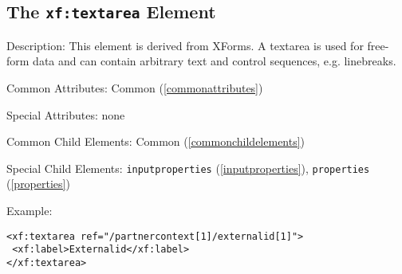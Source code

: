 \subsection{ The \texttt{xf:textarea} Element}
\begin{description}
 \item Description: This element is derived from XForms. A textarea is used for free-form data and can contain arbitrary text and control sequences, e.g. linebreaks.

 \item Common Attributes: Common (\ref{commonattributes})

 \item Special Attributes: none

 \item Common Child Elements: Common (\ref{commonchildelements})

 \item Special Child Elements: \texttt{inputproperties} (\ref{inputproperties}), \texttt{properties} (\ref{properties})

 \item Example: 

\begin{lstlisting}[caption=\texttt{xf:textarea} Element]
<xf:textarea ref="/partnercontext[1]/externalid[1]">
 <xf:label>Externalid</xf:label>
</xf:textarea>
\end{lstlisting}
\end{description}











